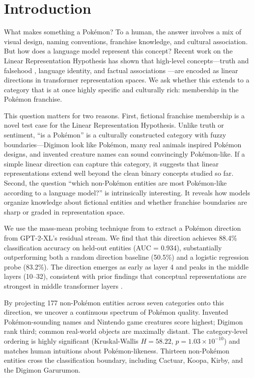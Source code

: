 \section{Introduction}
\label{sec:intro}

What makes something a Pok\'{e}mon? To a human, the answer involves a mix of visual design, naming conventions, franchise knowledge, and cultural association. But how does a language model represent this concept? Recent work on the Linear Representation Hypothesis \citep{park2024linear} has shown that high-level concepts---truth and falsehood \citep{marks2024geometry}, language identity, and factual associations \citep{meng2022locating}---are encoded as linear directions in transformer representation spaces. We ask whether this extends to a category that is at once highly specific and culturally rich: membership in the Pok\'{e}mon franchise.

This question matters for two reasons. First, fictional franchise membership is a novel test case for the Linear Representation Hypothesis. Unlike truth or sentiment, ``is a Pok\'{e}mon'' is a culturally constructed category with fuzzy boundaries---Digimon look like Pok\'{e}mon, many real animals inspired Pok\'{e}mon designs, and invented creature names can sound convincingly Pok\'{e}mon-like. If a simple linear direction can capture this category, it suggests that linear representations extend well beyond the clean binary concepts studied so far. Second, the question ``which non-Pok\'{e}mon entities are most Pok\'{e}mon-like according to a language model?'' is intrinsically interesting. It reveals how models organize knowledge about fictional entities and whether franchise boundaries are sharp or graded in representation space.

We use the mass-mean probing technique from \citet{marks2024geometry} to extract a Pok\'{e}mon direction from GPT-2-XL's residual stream. We find that this direction achieves 88.4\% classification accuracy on held-out entities (AUC = 0.934), substantially outperforming both a random direction baseline (50.5\%) and a logistic regression probe (83.2\%). The direction emerges as early as layer 4 and peaks in the middle layers (10--32), consistent with prior findings that conceptual representations are strongest in middle transformer layers \citep{meng2022locating, marks2024geometry}.

By projecting 177 non-Pok\'{e}mon entities across seven categories onto this direction, we uncover a continuous spectrum of Pok\'{e}mon quality. Invented Pok\'{e}mon-sounding names and Nintendo game creatures score highest; Digimon rank third; common real-world objects are maximally distant. The category-level ordering is highly significant (Kruskal-Wallis $H = 58.22$, $p = 1.03 \times 10^{-10}$) and matches human intuitions about Pok\'{e}mon-likeness. Thirteen non-Pok\'{e}mon entities cross the classification boundary, including Cactuar, Koopa, Kirby, and the Digimon Garurumon.

